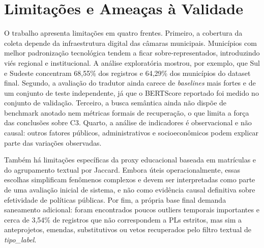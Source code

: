 \section{Limitações e Ameaças à Validade}

O trabalho apresenta limitações em quatro frentes. Primeiro, a cobertura da coleta depende da infraestrutura digital das câmaras municipais. Municípios com melhor padronização tecnológica tendem a ficar sobre-representados, introduzindo viés regional e institucional. A análise exploratória mostrou, por exemplo, que Sul e Sudeste concentram 68,55\% dos registros e 64,29\% dos municípios do dataset final. Segundo, a avaliação do tradutor ainda carece de \textit{baselines} mais fortes e de um conjunto de teste independente, já que o BERTScore reportado foi medido no conjunto de validação. Terceiro, a busca semântica ainda não dispõe de benchmark anotado nem métricas formais de recuperação, o que limita a força das conclusões sobre C3. Quarto, a análise de indicadores é observacional e não causal: outros fatores públicos, administrativos e socioeconômicos podem explicar parte das variações observadas.

Também há limitações específicas da proxy educacional baseada em matrículas e do agrupamento textual por Jaccard. Embora úteis operacionalmente, essas escolhas simplificam fenômenos complexos e devem ser interpretadas como parte de uma avaliação inicial de sistema, e não como evidência causal definitiva sobre efetividade de políticas públicas. Por fim, a própria base final demanda saneamento adicional: foram encontrados poucos outliers temporais importantes e cerca de 3,54\% de registros que não correspondem a PLs estritos, mas sim a anteprojetos, emendas, substitutivos ou vetos recuperados pelo filtro textual de \textit{tipo\_label}.
